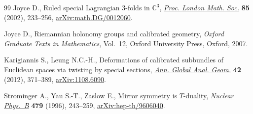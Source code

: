 \documentclass[10pt,a4paper]{amsart}
\numberwithin{equation}{section}
\begin{document}
\begin{thebibliography}{99}
Joyce D., Ruled special {L}agrangian 3-folds in {$\mathbb C^3$}, \href{https://doi.org/10.1112/S0024611502013485}{\textit{Proc.
 London Math. Soc.}} \textbf{85} (2002), 233--256, \href{https://arxiv.org/abs/math.DG/0012060}{arXiv:math.DG/0012060}.

Joyce D., Riemannian holonomy groups and calibrated geometry, \textit{Oxford
 Graduate Texts in Mathematics}, Vol.~12, Oxford University Press, Oxford,
 2007.

Karigiannis S., Leung N.C.-H., Deformations of calibrated subbundles of
 {E}uclidean spaces via twisting by special sections, \href{https://doi.org/10.1007/s10455-012-9317-1}{\textit{Ann. Global
 Anal. Geom.}} \textbf{42} (2012), 371--389, \href{https://arxiv.org/abs/1108.6090}{arXiv:1108.6090}.

Strominger A., Yau S.-T., Zaslow E., Mirror symmetry is {$T$}-duality,
 \href{https://doi.org/10.1016/0550-3213(96)00434-8}{\textit{Nuclear Phys.~B}} \textbf{479} (1996), 243--259,
 \href{https://arxiv.org/abs/hep-th/9606040}{arXiv:hep-th/9606040}.

\end{thebibliography}
\end{document}
